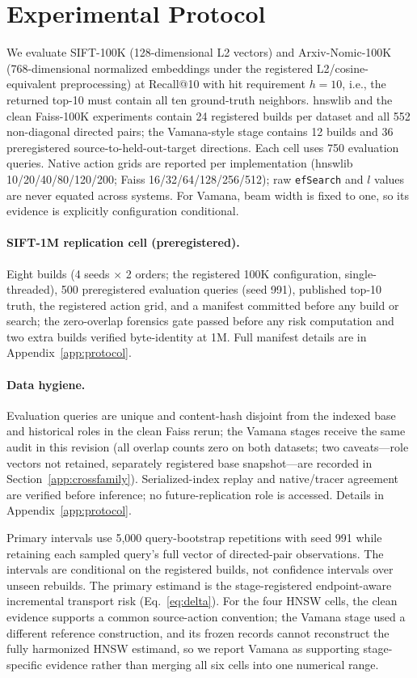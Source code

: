 \documentclass{article}
\begin{document}
\section{Experimental Protocol}
\label{sec:protocol}

We evaluate SIFT-100K (128-dimensional L2 vectors) and Arxiv-Nomic-100K (768-dimensional normalized
embeddings under the registered L2/cosine-equivalent preprocessing) at Recall@10 with hit requirement
$h=10$, i.e., the returned top-10 must contain all ten ground-truth neighbors. hnswlib and the clean
Faiss-100K experiments contain 24 registered builds per dataset and all 552 non-diagonal directed pairs;
the Vamana-style stage contains 12 builds and 36 preregistered source-to-held-out-target directions. Each
cell uses 750 evaluation queries. Native action grids are reported per implementation (hnswlib
10/20/40/80/120/200; Faiss 16/32/64/128/256/512); raw \texttt{efSearch} and $l$ values are never equated
across systems. For Vamana, beam width is fixed to one, so its evidence is explicitly configuration
conditional.

\paragraph{SIFT-1M replication cell (preregistered).}
Eight builds (4 seeds $\times$ 2 orders; the registered 100K configuration, single-threaded), 500
preregistered evaluation queries (seed 991), published top-10 truth, the registered action grid, and a
manifest committed before any build or search; the zero-overlap forensics gate passed before any risk
computation and two extra builds verified byte-identity at 1M. Full manifest details are in
Appendix~\ref{app:protocol}.

\paragraph{Data hygiene.}
Evaluation queries are unique and content-hash disjoint from the indexed base and historical roles in the
clean Faiss rerun; the Vamana stages receive the same audit in this revision (all overlap counts zero on
both datasets; two caveats---role vectors not retained, separately registered base snapshot---are recorded
in Section~\ref{app:crossfamily}). Serialized-index replay and native/tracer agreement are verified before
inference; no future-replication role is accessed. Details in Appendix~\ref{app:protocol}.

Primary intervals use 5{,}000 query-bootstrap repetitions with seed 991 while retaining each sampled
query's full vector of directed-pair observations. The intervals are conditional on the registered builds,
not confidence intervals over unseen rebuilds. The primary estimand is the stage-registered endpoint-aware
incremental transport risk (Eq.~\ref{eq:delta}). For the four HNSW cells, the clean evidence supports a
common source-action convention; the Vamana stage used a different reference construction, and its frozen
records cannot reconstruct the fully harmonized HNSW estimand, so we report Vamana as supporting
stage-specific evidence rather than merging all six cells into one numerical range.
\end{document}
